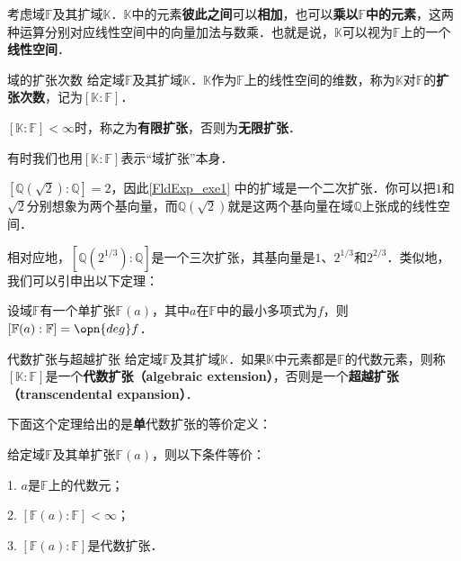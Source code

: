 考虑域$\mathbb{F}$及其扩域$\mathbb{K}$．$\mathbb{K}$中的元素\textbf{彼此之间}可以\textbf{相加}，也可以\textbf{乘以}$\mathbb{F}$\textbf{中的元素}，这两种运算分别对应线性空间中的向量加法与数乘．也就是说，$\mathbb{K}$可以视为$\mathbb{F}$上的一个\textbf{线性空间}．

\begin{definition}{域的扩张次数}
给定域$\mathbb{F}$及其扩域$\mathbb{K}$．$\mathbb{K}$作为$\mathbb{F}$上的线性空间的维数，称为$\mathbb{K}$对$\mathbb{F}$的\textbf{扩张次数}，记为$[\mathbb{K}:\mathbb{F}]$．

$[\mathbb{K}:\mathbb{F}]<\infty$时，称之为\textbf{有限扩张}，否则为\textbf{无限扩张}．

有时我们也用$[\mathbb{K}:\mathbb{F}]$表示“域扩张”本身．
\end{definition}

$[\mathbb{Q}(\sqrt{2}):\mathbb{Q}]=2$，因此\autoref{FldExp_exe1} 中的扩域是一个二次扩张．你可以把$1$和$\sqrt{2}$分别想象为两个基向量，而$\mathbb{Q}(\sqrt{2})$就是这两个基向量在域$\mathbb{Q}$上张成的线性空间．

相对应地，$[\mathbb{Q}(2^{1/3}):\mathbb{Q}]$是一个三次扩张，其基向量是$1$、$2^{1/3}$和$2^{2/3}$．类似地，我们可以引申出以下定理：

\begin{theorem}{}\label{FldExp_the1}
设域$\mathbb{F}$有一个单扩张$\mathbb{F}(a)$，其中$a$在$\mathbb{F}$中的最小多项式为$f$，则$[\mathbb{F}(a):\mathbb{F}]=\opn{deg}f$．
\end{theorem}

\begin{definition}{代数扩张与超越扩张}\label{FldExp_def3}
给定域$\mathbb{F}$及其扩域$\mathbb{K}$．如果$\mathbb{K}$中元素都是$\mathbb{F}$的代数元素，则称$[\mathbb{K}:\mathbb{F}]$是一个\textbf{代数扩张（algebraic extension）}，否则是一个\textbf{超越扩张（transcendental expansion）}．
\end{definition}

下面这个定理给出的是\textbf{单}代数扩张的等价定义：

\begin{theorem}{}\label{FldExp_the2}
给定域$\mathbb{F}$及其单扩张$\mathbb{F}(a)$，则以下条件等价：

1. $a$是$\mathbb{F}$上的代数元；

2. $[\mathbb{F}(a):\mathbb{F}]<\infty$；

3. $[\mathbb{F}(a):\mathbb{F}]$是代数扩张．

\end{theorem}


